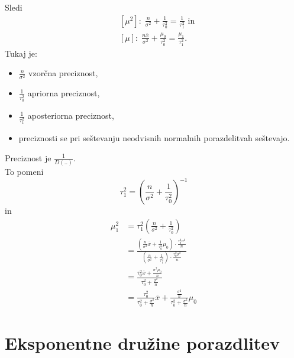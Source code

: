 \documentclass[a4paper, 12pt]{book}
\theoremstyle{definition}
\theoremstyle{remark}
\begin{document}
Sledi
\begin{align*}
  &[\mu^2]: \; \frac{n}{\sigma^2} + \frac{1}{\tau_0^2} = \frac{1}{\tau_1^2} \text{ in} \\
  &[\mu]: \; \frac{n \overline{x}}{\sigma^2} + \frac{\mu_0}{\tau_0^2} = \frac{\mu_1}{\tau_1^2}.
\end{align*}
Tukaj je:
\begin{itemize}
  \item $\frac{n}{\sigma^2}$ vzorčna preciznost,
  \item $\frac{1}{\tau_0^2}$ apriorna preciznost,
  \item $\frac{1}{\tau_1^2}$ aposteriorna preciznost,
  \item preciznosti se pri seštevanju neodvisnih normalnih porazdelitvah seštevajo.
\end{itemize}
Preciznost je $\frac{1}{D(..)}$. \\
To pomeni
\begin{equation*}
  \tau_1^2 = (\frac{n}{\sigma^2} + \frac{1}{\tau_0^2})^{-1}
\end{equation*}
in
\begin{align*}
  \mu_1^2 &= \tau_1^2 (\frac{n}{\sigma^2} + \frac{1}{\tau_0^2}) \\
  &= \frac{(\frac{n}{\sigma^2} \overline{x} + \frac{1}{\tau_0^2} \mu_0) \cdot \frac{\tau_0^2 \sigma^2}{n}}
    {(\frac{n}{\sigma^2} + \frac{1}{\tau_1^2}) \cdot \frac{\tau_0^2 \sigma^2}{n}} \\
  &= \frac{\tau_0^2 \overline{x} + \frac{\sigma^2 \mu_0}{n}}{\tau_0^2 + \frac{\sigma^2}{n}} \\
  &= \frac{\tau_0^2}{\tau_0^2 + \frac{\sigma^2}{n}} \overline{x} +
    \frac{\frac{\sigma^2}{n}}{\tau_0^2 + \frac{\sigma^2}{n}} \mu_0
\end{align*}


\section{Eksponentne družine porazdlitev}
\end{document}
